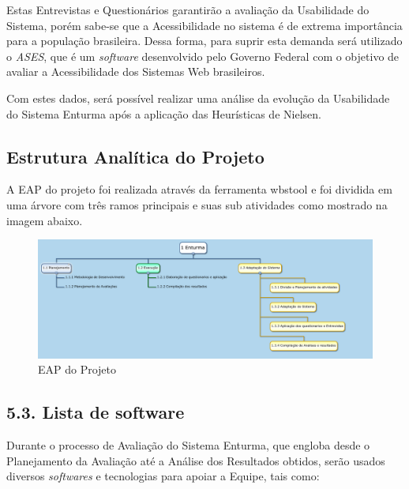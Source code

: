 	Estas Entrevistas e Questionários garantirão a avaliação da Usabilidade do Sistema, porém sabe-se que a Acessibilidade no sistema é de extrema importância para a população brasileira. Dessa forma, para suprir esta demanda será utilizado o \textit{ASES}, que é um \textit{software} desenvolvido pelo Governo Federal com o objetivo de avaliar a Acessibilidade dos Sistemas Web brasileiros.

	Com estes dados, será possível realizar uma análise da evolução da Usabilidade do Sistema Enturma após a aplicação das Heurísticas de Nielsen.

\subsection{Estrutura Analítica do Projeto}
	
	A EAP do projeto foi realizada através da ferramenta wbstool e foi dividida em uma árvore com três ramos principais e suas sub atividades como mostrado na imagem abaixo.

	\begin{figure}[H]
		\centering
		\includegraphics[width=1\textwidth]{imagens/EAP}
		\caption{EAP do Projeto}
		\label{img:EAP}
	\end{figure}
	
	

\subsection{5.3. Lista de software}
	
	Durante o processo de Avaliação do Sistema Enturma, que engloba desde o Planejamento da Avaliação até a Análise dos Resultados obtidos, serão usados diversos \textit{softwares} e tecnologias para apoiar a Equipe, tais como:

